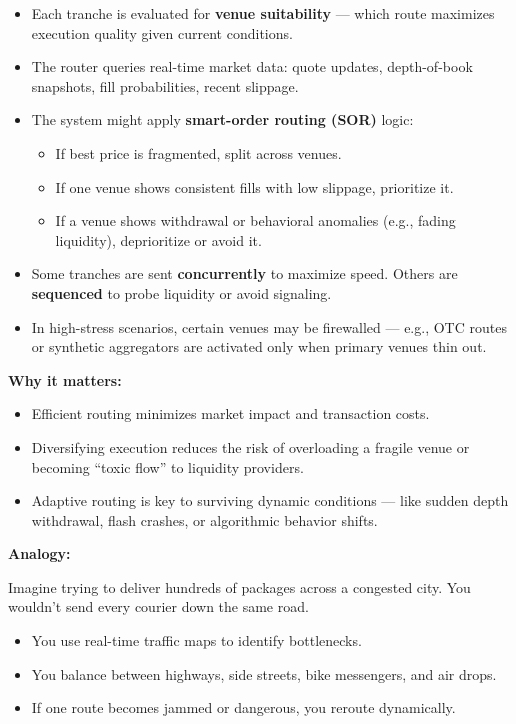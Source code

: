 \begin{itemize}
\item Each tranche is evaluated for \textbf{venue suitability} — which route maximizes execution quality given 
current conditions.
\item The router queries real-time market data: quote updates, depth-of-book snapshots, fill probabilities, 
recent slippage.
\item The system might apply \textbf{smart-order routing (SOR)} logic:
  \begin{itemize}
  \item If best price is fragmented, split across venues.
  \item If one venue shows consistent fills with low slippage, prioritize it.
  \item If a venue shows withdrawal or behavioral anomalies (e.g., fading liquidity), deprioritize or avoid it.
  \end{itemize}
\item Some tranches are sent \textbf{concurrently} to maximize speed. Others are \textbf{sequenced} to probe liquidity or avoid signaling.
\item In high-stress scenarios, certain venues may be firewalled — e.g., OTC routes or synthetic aggregators are activated only when primary venues thin out.
\end{itemize}

\textbf{Why it matters:}

\begin{itemize}
\item Efficient routing minimizes market impact and transaction costs.
\item Diversifying execution reduces the risk of overloading a fragile venue or becoming “toxic flow” to liquidity providers.
\item Adaptive routing is key to surviving dynamic conditions — like sudden depth withdrawal, flash crashes, or algorithmic behavior shifts.
\end{itemize}

\textbf{Analogy:}

Imagine trying to deliver hundreds of packages across a congested city. You wouldn’t send every courier down the same road.

\begin{itemize}
  \item You use real-time traffic maps to identify bottlenecks.
  \item You balance between highways, side streets, bike messengers, and air drops.
  \item If one route becomes jammed or dangerous, you reroute dynamically.
\end{itemize}

